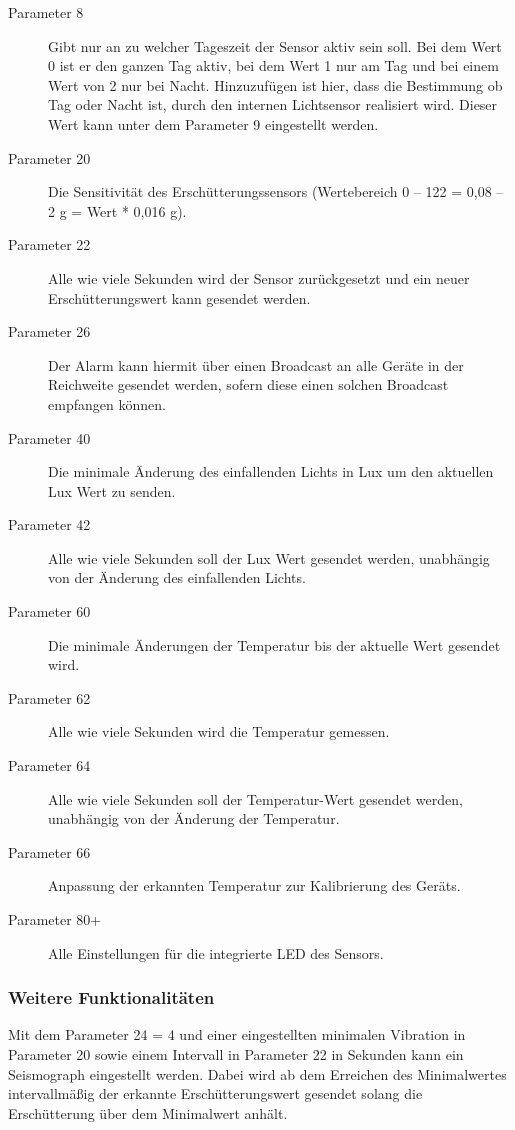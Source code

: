 \begin{description}
	\item [Parameter 8] Gibt nur an zu welcher Tageszeit der Sensor aktiv sein soll. Bei dem Wert 0 ist er den ganzen Tag aktiv, bei dem Wert 1 nur am Tag und bei einem Wert von 2 nur bei Nacht. Hinzuzufügen ist hier, dass die Bestimmung ob Tag oder Nacht ist, durch den internen Lichtsensor realisiert wird. Dieser Wert kann unter dem Parameter 9 eingestellt werden.
	\item [Parameter 20] Die Sensitivität des Erschütterungssensors (Wertebereich 0 – 122 = 0,08 –  2 g = Wert * 0,016 g).
	\item [Parameter 22] Alle wie viele Sekunden wird der Sensor zurückgesetzt und ein neuer Erschütterungswert kann gesendet werden.
	\item [Parameter 26] Der Alarm kann hiermit über einen Broadcast an alle Geräte in der Reichweite gesendet werden, sofern diese einen solchen Broadcast empfangen können.
	\item [Parameter 40] Die minimale Änderung des einfallenden Lichts in Lux um den aktuellen Lux Wert zu senden.
	\item [Parameter 42] Alle wie viele Sekunden soll der Lux Wert gesendet werden, unabhängig von der Änderung des einfallenden Lichts.
	\item [Parameter 60] Die minimale Änderungen der Temperatur bis der aktuelle Wert gesendet wird.
	\item [Parameter 62] Alle wie viele Sekunden wird die Temperatur gemessen.
	\item [Parameter 64] Alle wie viele Sekunden soll der Temperatur-Wert gesendet werden, unabhängig von der Änderung der Temperatur.
	\item [Parameter 66] Anpassung der erkannten Temperatur zur Kalibrierung des Geräts.
	\item [Parameter 80+] Alle Einstellungen für die integrierte LED des Sensors.
\end{description}

\subsubsection{Weitere Funktionalitäten}
Mit dem Parameter 24 = 4 und einer eingestellten minimalen Vibration in Parameter 20 sowie einem Intervall in Parameter 22 in Sekunden kann ein Seismograph eingestellt werden. Dabei wird ab dem Erreichen des Minimalwertes intervallmäßig der erkannte Erschütterungswert gesendet solang die Erschütterung über dem Minimalwert anhält.

